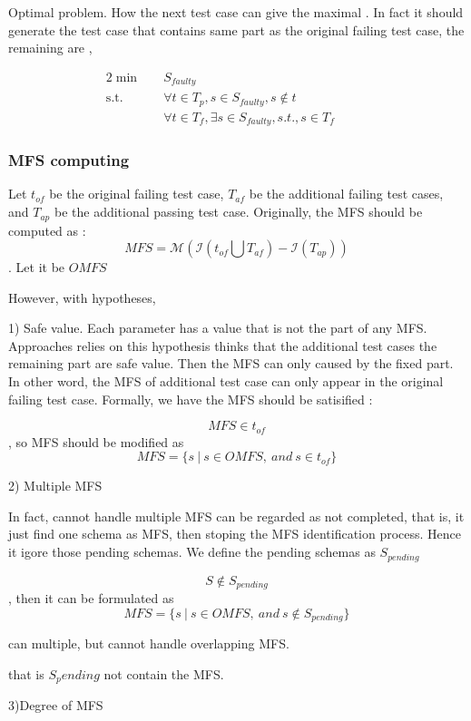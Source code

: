 \documentclass[10pt,journal,cspaper,compsoc]{IEEEtran}
\begin{document}
Optimal problem. How the next test case can give the maximal . In fact it should generate the test case that contains same part as the original failing test case, the remaining are ,

\begin{alignat}{2}
\min\quad &  S_{faulty} &{}& \tag{EQ8} \label{eq-optimal-testcase}\\
\mbox{s.t.}\quad
& \forall t \in T_{p}, s \in S_{faulty}, s \not\in t &\quad& {}\nonumber \\
& \forall t \in T_{f}, \exists s \in S_{faulty}, s.t., s \in T_{f} &\quad& {}\nonumber
\end{alignat}


\subsubsection{MFS computing}

Let $t_{of}$ be the original failing test case, $T_{af}$ be the additional failing test cases, and $T_{ap}$ be the additional passing test case. Originally, the MFS should be computed as :
$$ MFS =  \mathcal{M}(\mathcal{I}(t_{of} \bigcup T_{af}) - \mathcal{I}(T_{ap})) $$. Let it be $OMFS$

However, with hypotheses, 

1) Safe value.  Each parameter has a value that is not the part of any MFS. Approaches relies on this hypothesis thinks that the additional test cases the remaining part are safe value. Then the MFS can only caused by the fixed part. In other word, the MFS of additional test case can only appear in the original failing test case. Formally, we have the MFS should be satisified :

$$ MFS \in  t_{of}$$, so MFS should be modified as  $$ MFS = \{ s\ |\ s \in OMFS,\ and\ s \in t_{of} \} $$

2) Multiple MFS 

In fact, cannot handle multiple MFS can be regarded as not completed, that is, it just find one schema as MFS, then stoping the MFS identification process. Hence it igore those pending schemas. We define the pending schemas as $S_{pending}$

$$S \not\in S_{pending}$$, then it can be formulated as  $$ MFS = \{ s\ |\ s \in OMFS,\ and\ s \not\in S_{pending} \} $$

can multiple, but cannot handle overlapping MFS.

that is $S_pending$ not contain the MFS.

3)Degree of MFS
\end{document}
